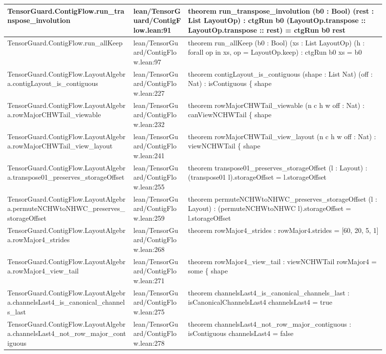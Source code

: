 \documentclass[10pt]{article}
\begin{document}
\begin{longtable}{|p{0.30\linewidth}|p{0.13\linewidth}|p{0.47\linewidth}|}
\hline
TensorGuard.ContigFlow.run\_transpose\_involution & lean/TensorGuard/ContigFlow.lean:91 & theorem run\_transpose\_involution (b0 : Bool) (rest : List LayoutOp) : ctgRun b0 (LayoutOp.transpose :: LayoutOp.transpose :: rest) = ctgRun b0 rest \\
\hline
TensorGuard.ContigFlow.run\_allKeep & lean/TensorGuard/ContigFlow.lean:97 & theorem run\_allKeep (b0 : Bool) (xs : List LayoutOp) (h : forall op in xs, op = LayoutOp.keep) : ctgRun b0 xs = b0 \\
\hline
TensorGuard.ContigFlow.LayoutAlgebra.contigLayout\_is\_contiguous & lean/TensorGuard/ContigFlow.lean:227 & theorem contigLayout\_is\_contiguous (shape : List Nat) (off : Nat) : isContiguous \{ shape \\
\hline
TensorGuard.ContigFlow.LayoutAlgebra.rowMajorCHWTail\_viewable & lean/TensorGuard/ContigFlow.lean:232 & theorem rowMajorCHWTail\_viewable (n c h w off : Nat) : canViewNCHWTail \{ shape \\
\hline
TensorGuard.ContigFlow.LayoutAlgebra.rowMajorCHWTail\_view\_layout & lean/TensorGuard/ContigFlow.lean:241 & theorem rowMajorCHWTail\_view\_layout (n c h w off : Nat) : viewNCHWTail \{ shape \\
\hline
TensorGuard.ContigFlow.LayoutAlgebra.transpose01\_preserves\_storageOffset & lean/TensorGuard/ContigFlow.lean:255 & theorem transpose01\_preserves\_storageOffset (l : Layout) : (transpose01 l).storageOffset = l.storageOffset \\
\hline
TensorGuard.ContigFlow.LayoutAlgebra.permuteNCHWtoNHWC\_preserves\_storageOffset & lean/TensorGuard/ContigFlow.lean:259 & theorem permuteNCHWtoNHWC\_preserves\_storageOffset (l : Layout) : (permuteNCHWtoNHWC l).storageOffset = l.storageOffset \\
\hline
TensorGuard.ContigFlow.LayoutAlgebra.rowMajor4\_strides & lean/TensorGuard/ContigFlow.lean:268 & theorem rowMajor4\_strides : rowMajor4.strides = [60, 20, 5, 1] \\
\hline
TensorGuard.ContigFlow.LayoutAlgebra.rowMajor4\_view\_tail & lean/TensorGuard/ContigFlow.lean:271 & theorem rowMajor4\_view\_tail : viewNCHWTail rowMajor4 = some \{ shape \\
\hline
TensorGuard.ContigFlow.LayoutAlgebra.channelsLast4\_is\_canonical\_channels\_last & lean/TensorGuard/ContigFlow.lean:275 & theorem channelsLast4\_is\_canonical\_channels\_last : isCanonicalChannelsLast4 channelsLast4 = true \\
\hline
TensorGuard.ContigFlow.LayoutAlgebra.channelsLast4\_not\_row\_major\_contiguous & lean/TensorGuard/ContigFlow.lean:278 & theorem channelsLast4\_not\_row\_major\_contiguous : isContiguous channelsLast4 = false \\

\end{longtable}
\end{document}
